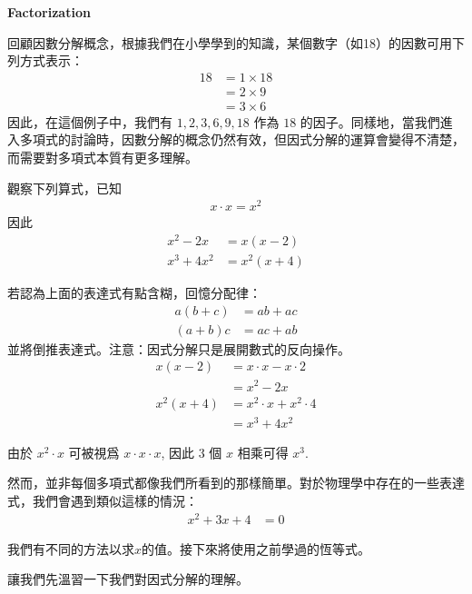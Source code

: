 \documentclass[12pt]{article}
\begin{document}
    \pagestyle{fancy}
    \begin{center}
        \textbf{Factorization}
    \end{center}

    回顧因數分解概念，根據我們在小學學到的知識，某個數字（如18）的因數可用下列方式表示： \begin{align*}
        18&=1\times 18\\
        &=2\times 9\\
        &=3\times 6
    \end{align*}
    因此，在這個例子中，我們有 $1,2,3,6,9,18$ 作為 $18$ 的因子。同樣地，當我們進入多項式的討論時，因數分解的概念仍然有效，但因式分解的運算會變得不清楚，而需要對多項式本質有更多理解。

    觀察下列算式，已知 \begin{align*}
        x\cdot x=x^2
    \end{align*} 因此\begin{align*}
        x^2-2x&=x(x-2)\\
        x^3+4x^2&=x^2(x+4)
    \end{align*}

    若認為上面的表達式有點含糊，回憶分配律：\begin{align*}
        a(b+c)&=ab+ac\\
        (a+b)c&=ac+ab
    \end{align*} 並將倒推表達式。注意：因式分解只是展開數式的反向操作。\begin{align*}
        x(x-2)&=x\cdot x-x\cdot 2\\
        &=x^2-2x\\
        x^2(x+4)&=x^2\cdot x+x^2\cdot 4\\
        &=x^3+4x^2
    \end{align*}

    由於 $x^2\cdot x$ 可被視爲 $x\cdot x\cdot x$, 因此 3 個 $x$ 相乘可得 $x^3$.

    然而，並非每個多項式都像我們所看到的那樣簡單。對於物理學中存在的一些表達式，我們會遇到類似這樣的情況：\begin{align*}
        x^2+3x+4&=0
    \end{align*}

    我們有不同的方法以求$x$的值。接下來將使用之前學過的恆等式。

    讓我們先溫習一下我們對因式分解的理解。
\end{document}
